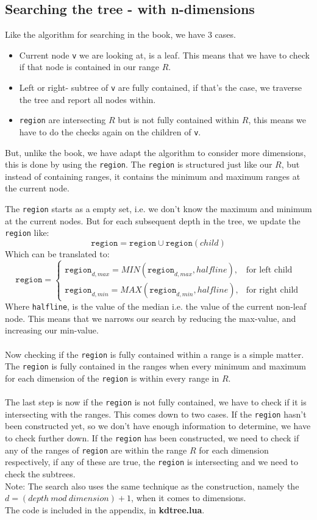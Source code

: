 \documentclass{article}
\begin{document}
\subsection{Searching the tree - with n-dimensions}
Like the algorithm for searching in the book, we have 3 cases.
\begin{itemize}
 \item Current node \texttt{v} we are looking at, is a leaf. This means that we have to check if that node is contained in our range $R$.
 \item Left or right- subtree of \texttt{v} are fully contained, if that's the case, we traverse the tree and report all nodes within.
 \item \texttt{region} are intersecting $R$ but is not fully contained within $R$, this means we have to do the checks again on the children of \texttt{v}.
\end{itemize}
But, unlike the book, we have adapt the algorithm to consider more dimensions, this is done by using the \texttt{region}.
The \texttt{region} is structured just like our $R$, but instead of containing ranges, it contains the minimum and maximum ranges at the current node.

The \texttt{region} starts as a empty set, i.e. we don't know the maximum and minimum at the current nodes. 
But for each subsequent depth in the tree, we update the \texttt{region} like:
\[
    \texttt{region}= 
    \texttt{region} \cup \texttt{region}(child)
\]
Which can be translated to:
\[
    \texttt{region}= 
\begin{cases}
    \texttt{region}_{d,max} = MIN(\texttt{region}_{d,max},halfline),&\text{for left child} \\
    \texttt{region}_{d,min} = MAX(\texttt{region}_{d,min},halfline),& \text{for right child}
\end{cases}
\]
Where \texttt{halfline}, is the value of the median i.e. the value of the current non-leaf node.
This means that we narrows our search by reducing the max-value, and increasing our min-value.\\
 \\
Now checking if the \texttt{region} is fully contained within a range is a simple matter.
The \texttt{region} is fully contained in the ranges when every minimum and maximum for each dimension of the \texttt{region} is within every range in $R$.\\
 \\
The last step is now if the \texttt{region} is not fully contained, we have to check if it is intersecting with the ranges. This comes down to two cases.
If the \texttt{region} hasn't been constructed yet, so we don't have enough information to determine, we have to check further down.
If the \texttt{region} has been constructed, we need to check if any of the ranges of \texttt{region} are within the range $R$ for each dimension respectively, if any of these are true,
the \texttt{region} is intersecting and we need to check the subtrees.\\
Note: The search also uses the same technique as the construction, namely the $d = (depth\ mod\ dimension)+1$, when it comes to dimensions.
 \\
The code is included in the appendix, in \textbf{kdtree.lua}.
\end{document}
